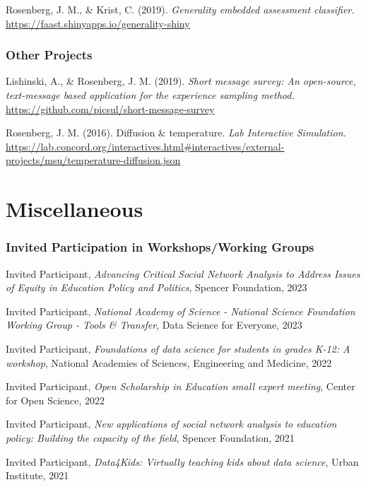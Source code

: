 \documentclass[
  14,
]{article}
\begin{document}
Rosenberg, J. M., \& Krist, C. (2019). \emph{Generality embedded
assessment classifier.}
\url{https://faast.shinyapps.io/generality-shiny}

\hypertarget{other-projects}{%
\subsubsection{Other Projects}\label{other-projects}}

Lishinski, A., \& Rosenberg, J. M. (2019). \emph{Short message survey:
An open-source, text-message based application for the experience
sampling method.} \url{https://github.com/picsul/short-message-survey}

Rosenberg, J. M. (2016). Diffusion \& temperature. \emph{Lab Interactive
Simulation.}
\url{https://lab.concord.org/interactives.html\#interactives/external-projects/msu/temperature-diffusion.json}

\hypertarget{miscellaneous}{%
\section{Miscellaneous}\label{miscellaneous}}

\hypertarget{invited-participation-in-workshopsworking-groups}{%
\subsubsection{Invited Participation in Workshops/Working
Groups}\label{invited-participation-in-workshopsworking-groups}}

Invited Participant, \emph{Advancing Critical Social Network Analysis to
Address Issues of Equity in Education Policy and Politics}, Spencer
Foundation, 2023

Invited Participant, \emph{National Academy of Science - National
Science Foundation Working Group - Tools \& Transfer}, Data Science for
Everyone, 2023

Invited Participant, \emph{Foundations of data science for students in
grades K-12: A workshop}, National Academies of Sciences, Engineering
and Medicine, 2022

Invited Participant, \emph{Open Scholarship in Education small expert
meeting}, Center for Open Science, 2022

Invited Participant, \emph{New applications of social network analysis
to education policy: Building the capacity of the field}, Spencer
Foundation, 2021

Invited Participant, \emph{Data4Kids: Virtually teaching kids about data
science}, Urban Institute, 2021
\end{document}
